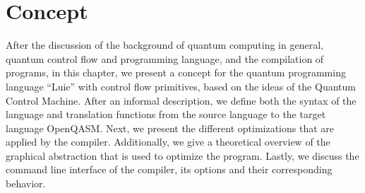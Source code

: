 \chapter{Concept}
After the discussion of the background of quantum computing in general, quantum control flow and programming language, and the compilation of programs, in this chapter, we present a concept for the quantum programming language ``Luie'' with control flow primitives, based on the ideas of the Quantum Control Machine. After an informal description, we define both the syntax of the language and translation functions from the source language to the target language OpenQASM.  
Next, we present the different optimizations that are applied by the compiler. Additionally, we give a theoretical overview of the graphical abstraction that is used to optimize the program.
Lastly, we discuss the command line interface of the compiler, its options and their corresponding behavior.   







%



